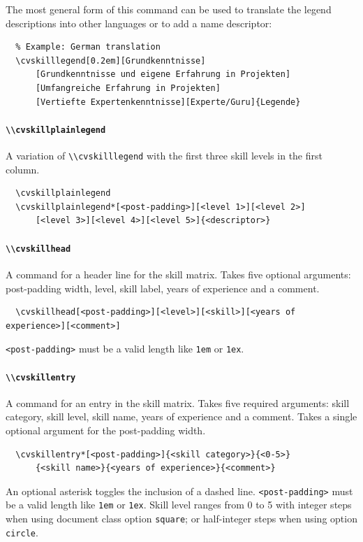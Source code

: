 \documentclass[a4paper, 11pt]{article}
\newcommand{\code}[1]{\lstinline!#1!}
\begin{document}
The most general form of this command can be used to translate the legend descriptions into other languages or to add a name descriptor:
\begin{lstlisting}
  % Example: German translation
  \cvskilllegend[0.2em][Grundkenntnisse]
      [Grundkenntnisse und eigene Erfahrung in Projekten]
      [Umfangreiche Erfahrung in Projekten]
      [Vertiefte Expertenkenntnisse][Experte/Guru]{Legende}
\end{lstlisting}

\paragraph{\code{\\cvskillplainlegend}}
A variation of \code{\\cvskilllegend} with the first three skill levels in the first column.
\begin{lstlisting}
  \cvskillplainlegend
  \cvskillplainlegend*[<post-padding>][<level 1>][<level 2>]
      [<level 3>][<level 4>][<level 5>]{<descriptor>}
\end{lstlisting}

\paragraph{\code{\\cvskillhead}}
A command for a header line for the skill matrix.
Takes five optional arguments: post-padding width, level, skill label, years of experience and a comment.
\begin{lstlisting}
  \cvskillhead[<post-padding>][<level>][<skill>][<years of experience>][<comment>]
\end{lstlisting}
\code{<post-padding>} must be a valid length like \code{1em} or \code{1ex}.

\paragraph{\code{\\cvskillentry}}
A command for an entry in the skill matrix.
Takes five required arguments: skill category, skill level, skill name, years of experience and a comment.
Takes a single optional argument for the post-padding width.
\begin{lstlisting}
  \cvskillentry*[<post-padding>]{<skill category>}{<0-5>}
      {<skill name>}{<years of experience>}{<comment>}
\end{lstlisting}
An optional asterisk toggles the inclusion of a dashed line.
\code{<post-padding>} must be a valid length like \code{1em} or \code{1ex}.
Skill level ranges from 0 to 5 with integer steps when using document class option \code{square}; or half-integer steps when using option \code{circle}.
\end{document}
